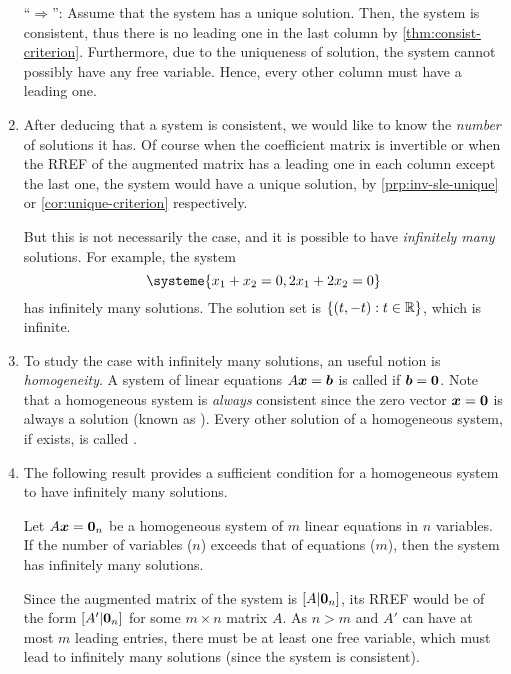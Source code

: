 \begin{enumerate}
\begin{pf}
``\(\Rightarrow\)'': Assume that the system has a unique solution. Then, the
system is consistent, thus there is no leading one in the last column by
\cref{thm:consist-criterion}. Furthermore, due to the uniqueness of solution,
the system cannot possibly have any free variable. Hence, every other column
must have a leading one.
\end{pf}

\item After deducing that a system is consistent, we would like to know the
\emph{number} of solutions it has. Of course when the coefficient matrix is
invertible or when the RREF of the augmented matrix has a leading one in each
column except the last one, the system would have a unique solution, by
\cref{prp:inv-sle-unique} or \cref{cor:unique-criterion} respectively.

But this is not necessarily the case, and it is possible to have
\emph{infinitely many} solutions. For example, the system
\[
\systeme{x_1+x_2=0,
2x_1+2x_2=0}
\]
has infinitely many solutions. The solution set is \(\{(t,-t):t\in\mathbb{R}\}\), which
is infinite.

\item To study the case with infinitely many solutions, an useful notion is
\emph{homogeneity}.  A system of linear equations \(A\vb*{x}=\vb*{b}\) is
called  if \(\vb*{b}=\vb*{0}\). Note that a homogeneous
system is \emph{always} consistent since the zero vector \(\vb*{x}=\vb*{0}\)
is always a solution (known as ). Every other solution
of a homogeneous system, if exists, is called .

\item The following result provides a sufficient condition for a homogeneous
system to have infinitely many solutions.

\begin{proposition}
\label{prp:homo-var-more-than-eqs-inf}
Let \(A\vb*{x}=\vb*{0}_n\) be a homogeneous system of \(m\) linear equations in
\(n\) variables. If the number of variables (\(n\)) exceeds that of equations
(\(m\)), then the system has infinitely many solutions.
\end{proposition}
\begin{pf}
Since the augmented matrix of the system is \([A|\vb*{0}_{n}]\), its RREF
would be of the form \([A'|\vb*{0}_{n}]\) for some \(m\times n\) matrix \(A\).
As \(n>m\) and \(A'\) can have at most \(m\) leading entries, there must be at
least one free variable, which must lead to infinitely many solutions (since
the system is consistent).
\end{pf}


\end{enumerate}
